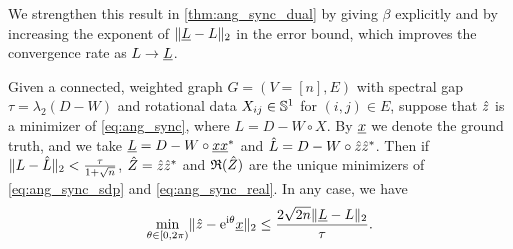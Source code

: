 We strengthen this result in \cref{thm:ang_sync_dual} by giving $\beta$ explicitly and by increasing the exponent of $\lVert \underline{L} - L \rVert_2$ in the error bound, which improves the convergence rate as $L \to \underline{L}$.
\medskip
\begin{theorem} \label{thm:ang_sync_dual}
  Given a connected, weighted graph $G = (V = [n], E)$ with spectral gap $\tau = \lambda_2(D - W)$ and rotational data $X_{ij} \in \mathbb{S}^1$ for $(i, j) \in E$, suppose that $\hat{z}$ is a minimizer of \eqref{eq:ang_sync}, where $L = D - W \circ X$.  By $\underline{x}$ we denote the ground truth, and we take $\underline{L} = D - W \circ \underline{x} \underline{x}^*$ and $\hat{L} = D - W \circ \hat{z} \hat{z}^*$.  Then if $\lVert L - \hat{L} \rVert_2 < \frac{\tau}{1 + \sqrt{n}}$, $\hat{Z} = \hat{z} \hat{z}^*$ and $\mathfrak{R}(\hat{Z})$ are the unique minimizers of \eqref{eq:ang_sync_sdp} and \eqref{eq:ang_sync_real}.  In any case, we have \begin{equation} \min_{\theta \in [0, 2\pi)} \lVert \hat{z} - \mathrm{e}^{\mathrm{i} \theta} \underline{x} \rVert_2 \le \dfrac{2 \sqrt{2 n} \lVert\underline{L} - L\rVert_2}{\tau}.\label{eq:ang_sync_bound}\end{equation}
\end{theorem}

